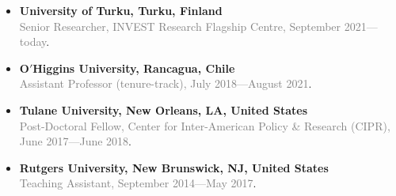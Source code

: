 \begin{itemize}
  \item[\textcolor{gray}{\textbullet}] {\bf University of Turku, Turku, Finland}\\
  \textcolor{gray}{Senior Researcher, INVEST Research Flagship Centre, September 2021---today}.

  \item[\textcolor{gray}{\textbullet}] {\bf O$'$Higgins University, Rancagua, Chile}\\
  \textcolor{gray}{Assistant Professor (tenure-track), July 2018---August 2021}.

  \item[\textcolor{gray}{\textbullet}] {\bf Tulane University, New Orleans, LA, United States}\\
  \textcolor{gray}{Post-Doctoral Fellow, Center for Inter-American Policy \& Research (CIPR), June 2017---June 2018}.

  \item[\textcolor{gray}{\textbullet}] {\bf Rutgers University, New Brunswick, NJ, United States}\\
 \textcolor{gray}{Teaching Assistant, September 2014---May 2017}.
\end{itemize}
